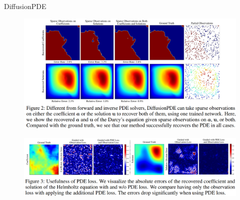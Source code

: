 \begin{frame}[allowframebreaks]{DiffusionPDE}
    \framebreak

    \begin{figure}
        \centering
        \includegraphics[width=\linewidth,height=\textheight,keepaspectratio]{images/adv-img-gen/diffusionpde-2.png}
    \end{figure}

    \framebreak

    \begin{figure}
        \centering
        \includegraphics[width=\linewidth,height=\textheight,keepaspectratio]{images/adv-img-gen/diffusionpde-3.png}
    \end{figure}
\end{frame}